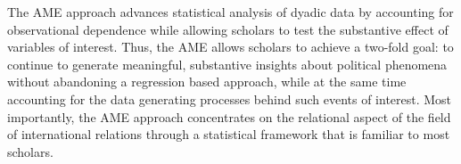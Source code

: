 The AME approach advances statistical analysis of dyadic data by accounting for observational dependence while allowing scholars to test the substantive effect of variables of interest. Thus, the AME allows scholars to achieve a two-fold goal: to continue to generate meaningful, substantive insights about political phenomena without abandoning a regression based approach, while at the same time accounting for the data generating processes behind such events of interest. Most importantly, the AME approach concentrates on the relational aspect of the field of international relations through a statistical framework that is familiar to most scholars.

